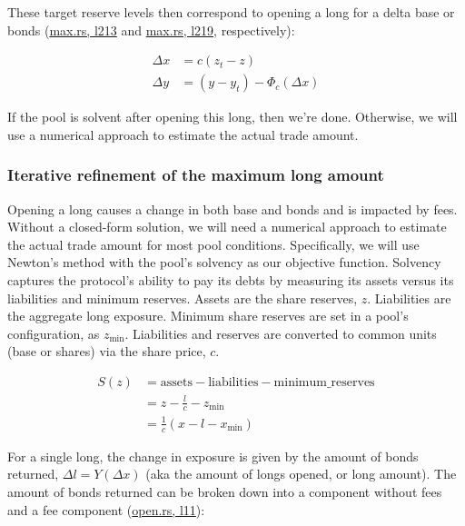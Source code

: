 These target reserve levels then correspond to opening a long for a delta base or bonds (\href{https://github.com/delvtech/hyperdrive/blob/f410574fffcb8b2556208c158494ba2972525843/crates/hyperdrive-math/src/long/max.rs#L207}{max.rs, l213} and \href{https://github.com/delvtech/hyperdrive/blob/f410574fffcb8b2556208c158494ba2972525843/crates/hyperdrive-math/src/long/max.rs#L213}{max.rs, l219}, respectively):

\begin{align}
\Delta x &= c (z_{t} - z) \label{dx} \\
\Delta y &= (y - y_{t}) - \Phi_{c}(\Delta x) \label{dy}
\end{align}

If the pool is solvent after opening this long, then we're done.
Otherwise, we will use a numerical approach to estimate the actual trade amount.

\subsubsection{Iterative refinement of the maximum long amount}

Opening a long causes a change in both base and bonds and is impacted by fees.
Without a closed-form solution, we will need a numerical approach to estimate the actual trade amount for most pool conditions.
Specifically, we will use Newton's method with the pool's solvency as our objective function.
Solvency captures the protocol's ability to pay its debts by measuring its assets versus its liabilities and minimum reserves.
Assets are the share reserves, $z$.
Liabilities are the aggregate long exposure.
Minimum share reserves are set in a pool's configuration, as $z_{\text{min}}$.
Liabilities and reserves are converted to common units (base or shares) via the share price, $c$.

\begin{equation}\label{solvency}
\begin{aligned}
S(z) &= \text{assets} - \text{liabilities} - \text{minimum\_reserves} \\
&= z - \tfrac{l}{c} - z_{\text{min}} \\
&= \tfrac{1}{c} \left( x - l - x_{\text{min}} \right)
\end{aligned}
\end{equation}

For a single long, the change in exposure is given by the amount of bonds returned, $\Delta l = Y(\Delta x)$ (aka the amount of longs opened, or long amount).
The amount of bonds returned can be broken down into a component without fees and a fee component (\href{https://github.com/delvtech/hyperdrive/blob/f410574fffcb8b2556208c158494ba2972525843/crates/hyperdrive-math/src/long/open.rs#L11}{open.rs, l11}):

